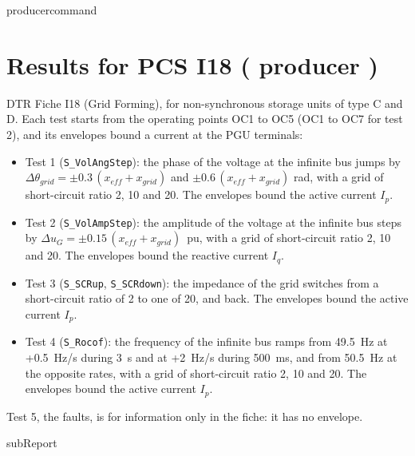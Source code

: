 {{ producercommand }}



    \section{Results for PCS I18 ({{ producer }})}

    DTR Fiche I18 (Grid Forming), for non-synchronous storage units of type C and D. Each test
    starts from the operating points OC1 to OC5 (OC1 to OC7 for test 2), and its envelopes bound
    a current at the PGU terminals:
    \begin{itemize}
        \item Test 1 (\texttt{S\_VolAngStep}): the phase of the voltage at the infinite bus jumps
        by \(\Delta\theta_{grid} = \pm 0.3\,(x_{eff} + x_{grid})\) and
        \(\pm 0.6\,(x_{eff} + x_{grid})\) rad, with a grid of short-circuit ratio 2, 10 and 20.
        The envelopes bound the active current \(I_p\).
        \item Test 2 (\texttt{S\_VolAmpStep}): the amplitude of the voltage at the infinite bus
        steps by \(\Delta u_G = \pm 0.15\,(x_{eff} + x_{grid})\)~pu, with a grid of
        short-circuit ratio 2, 10 and 20. The envelopes bound the reactive current \(I_q\).
        \item Test 3 (\texttt{S\_SCRup}, \texttt{S\_SCRdown}): the impedance of the grid switches
        from a short-circuit ratio of 2 to one of 20, and back. The envelopes bound the active
        current \(I_p\).
        \item Test 4 (\texttt{S\_Rocof}): the frequency of the infinite bus ramps from 49.5~Hz at
        +0.5~Hz/s during 3~s and at +2~Hz/s during 500~ms, and from 50.5~Hz at the opposite
        rates, with a grid of short-circuit ratio 2, 10 and 20. The envelopes bound the active
        current \(I_p\).
    \end{itemize}
    Test 5, the faults, is for information only in the fiche: it has no envelope.

    {{subReport}}
    \newpage
